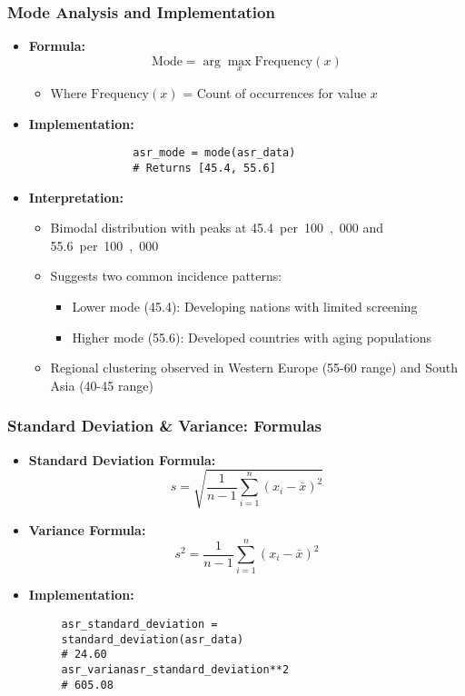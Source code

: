 \begin{frame}[fragile]
    \frametitle{Mode Analysis and Implementation}
    \begin{itemize}
        \item \textbf{Formula:}
              \[
                  \text{Mode} = \arg\max_{x} \text{Frequency}(x)
              \]
              \begin{itemize}
                  \item Where $\text{Frequency}(x)$ = Count of occurrences for value $x$
              \end{itemize}

        \item \textbf{Implementation:}
              \begin{lstlisting}
                asr_mode = mode(asr_data)  
                # Returns [45.4, 55.6]
            \end{lstlisting}

        \item \textbf{Interpretation:}
              \begin{itemize}
                  \item Bimodal distribution with peaks at \SI{45.4}{per 100,000} and \SI{55.6}{per 100,000}
                  \item Suggests two common incidence patterns:
                        \begin{itemize}
                            \item Lower mode (45.4): Developing nations with limited screening
                            \item Higher mode (55.6): Developed countries with aging populations
                        \end{itemize}
                  \item Regional clustering observed in Western Europe (55-60 range) and South Asia (40-45 range)
              \end{itemize}
    \end{itemize}
\end{frame}

\begin{frame}[fragile]
    \frametitle{Standard Deviation \& Variance: Formulas}
    \begin{itemize}
        \item \textbf{Standard Deviation Formula:}
              \[
                  s = \sqrt{\frac{1}{n-1} \sum_{i=1}^{n} (x_i - \bar{x})^2}
              \]

        \item \textbf{Variance Formula:}
              \[
                  s^2 = \frac{1}{n-1} \sum_{i=1}^{n} (x_i - \bar{x})^2
              \]

        \item \textbf{Implementation:}
              \begin{lstlisting}
     asr_standard_deviation = 
     standard_deviation(asr_data)  
     # 24.60
     asr_varianasr_standard_deviation**2  
     # 605.08
                    \end{lstlisting}
    \end{itemize}
\end{frame}

